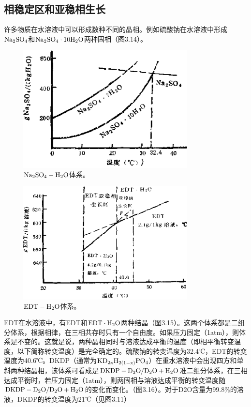 \subsection{相稳定区和亚稳相生长}
许多物质在水溶液中可以形成数种不同的晶相。例如硫酸钠在水溶液中形成$\rm Na_2SO_4$和$\rm Na_2SO_4\cdot 10H_2O$两种固相（图3.14）。

\begin{figure}[h]
 \centering
 \includegraphics[width=0.8\textwidth]{fig/cp03/img3.14.jpg}
 \caption{$\rm Na_2SO_4-H_2O$体系。}
\end{figure}

\begin{figure}[h]
 \centering
 \includegraphics[width=0.8\textwidth]{fig/cp03/img3.15.jpg}
 \caption{$\rm EDT-H_2O$体系。}
\end{figure}

EDT在水溶液中，有EDT和$\rm EDT\cdot H_2O$两种结晶（图3.15）。这两个体系都是二组分体系，根据相律，在三相共存时只有一个自由度。如果压力固定（1atm），则体系是不变的。这就是说，两种晶相同时与溶液达成平衡的温度（即相平衡转变温度，以下简称转变温度）是完全确定的。硫酸钠的转变温度为32.4℃，EDT的转变温度为40.6℃。DKDP（通常为$\rm KD_{2x}H_{2(1-x)}PO_4$）在重水溶液中会出现四方和单斜两种结晶相，该体系可看成是$\rm DKDP-D_2O/D_2O+H_2O$准二组分体系，在三相达成平衡时，若压力固定（1atm），则两固相与溶液达成平衡的转变温度随$\rm DKDP-D_2O/D_2O+H_2O$的变化而变化。（图3.16）。对于D2O含量为99.8\%的溶液，DKDP的转变温度为21℃（见图3.11）

